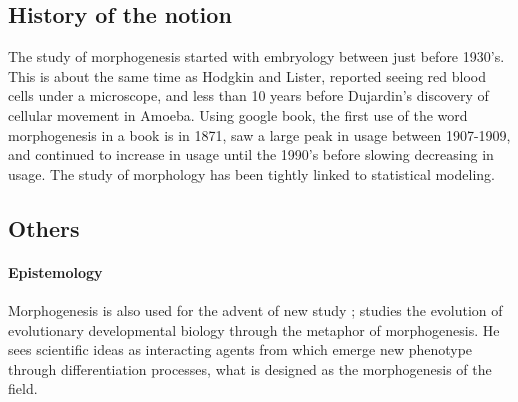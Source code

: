 \documentclass{article}
\begin{document}
\cite{straus1977societal}







\subsection{History of the notion}
The study of morphogenesis started with embryology between just before 1930's. This is about the same time as Hodgkin and Lister, reported seeing red blood cells under a microscope, and less than 10 years before Dujardin's discovery of cellular movement in Amoeba. \cite{abercrombie1977concepts} Using google book, the first use of the word morphogenesis in a book is in 1871, saw a large peak in usage between 1907-1909, and continued to increase in usage until the 1990's before slowing decreasing in usage. 
The study of morphology has been tightly linked to statistical modeling. 



\subsection{Others}

\paragraph{Epistemology}

Morphogenesis is also used for the advent of new study ;  \cite{gilbert2003morphogenesis} studies the evolution of evolutionary developmental biology through the metaphor of morphogenesis. He sees scientific ideas as interacting agents from which emerge new phenotype through differentiation processes, what is designed as the morphogenesis of the field.
\end{document}
